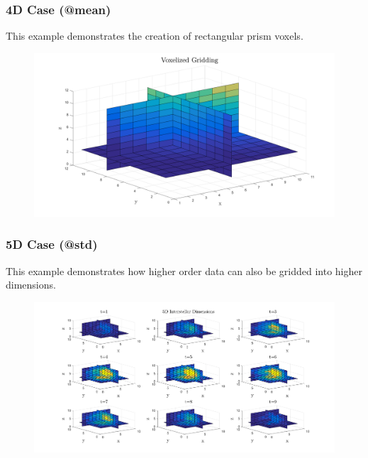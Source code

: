 \documentclass{article}
\begin{document}
\clearpage
\subsubsection*{4D Case (@mean)}
This example demonstrates the creation of rectangular prism voxels.  


\begin{figure}[H]
	\centering
	\includegraphics[width = \linewidth]{4d}
\end{figure}

\clearpage
\subsubsection*{5D Case (@std)}
This example demonstrates how higher order data can also be gridded into higher dimensions.


\begin{figure}[H]
	\centering
	\includegraphics[width = \linewidth]{5d}
\end{figure}
\end{document}
